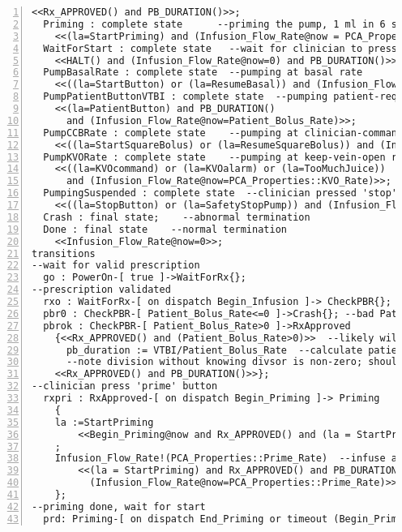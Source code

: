\begin{lstlisting}[language=aadl, gobble=0, numbers=left, caption={\lstinline{Rate_Controller} thread}, label={listing:aadl:rate_controller_thread}]
    <<Rx_APPROVED() and PB_DURATION()>>;
  Priming : complete state      --priming the pump, 1 ml in 6 sec
    <<(la=StartPriming) and (Infusion_Flow_Rate@now = PCA_Properties::Prime_Rate) and PB_DURATION()>>;
  WaitForStart : complete state   --wait for clinician to press 'start' button
    <<HALT() and (Infusion_Flow_Rate@now=0) and PB_DURATION()>>;
  PumpBasalRate : complete state  --pumping at basal rate
    <<((la=StartButton) or (la=ResumeBasal)) and (Infusion_Flow_Rate@now=Basal_Rate@now) and PB_DURATION()>>;
  PumpPatientButtonVTBI : complete state  --pumping patient-requested bolus
    <<(la=PatientButton) and PB_DURATION()
      and (Infusion_Flow_Rate@now=Patient_Bolus_Rate)>>;
  PumpCCBRate : complete state    --pumping at clinician-commanded bolus rate
    <<((la=StartSquareBolus) or (la=ResumeSquareBolus)) and (Infusion_Flow_Rate@now=Square_Bolus_Rate@now) and PB_DURATION()>>;
  PumpKVORate : complete state    --pumping at keep-vein-open rate
    <<((la=KVOcommand) or (la=KVOalarm) or (la=TooMuchJuice))  and PB_DURATION()
      and (Infusion_Flow_Rate@now=PCA_Properties::KVO_Rate)>>;
  PumpingSuspended : complete state  --clinician pressed 'stop' button
    <<((la=StopButton) or (la=SafetyStopPump)) and (Infusion_Flow_Rate@now=0)>>;
  Crash : final state;    --abnormal termination
  Done : final state    --normal termination
    <<Infusion_Flow_Rate@now=0>>;
transitions
--wait for valid prescription
  go : PowerOn-[ true ]->WaitForRx{};  
--prescription validated
  rxo : WaitForRx-[ on dispatch Begin_Infusion ]-> CheckPBR{};
  pbr0 : CheckPBR-[ Patient_Bolus_Rate<=0 ]->Crash{}; --bad Patient_Bolus_Rate
  pbrok : CheckPBR-[ Patient_Bolus_Rate>0 ]->RxApproved
    {<<Rx_APPROVED() and (Patient_Bolus_Rate>0)>>  --likely will change from logic variable to predicate Rx_APPROVED()
      pb_duration := VTBI/Patient_Bolus_Rate  --calculate patient bolus duration
      --note division without knowing divsor is non-zero; should generate additional proof obligations for assignment using division
    <<Rx_APPROVED() and PB_DURATION()>>};  
--clinician press 'prime' button
  rxpri : RxApproved-[ on dispatch Begin_Priming ]-> Priming  
    {
    la :=StartPriming
        <<Begin_Priming@now and Rx_APPROVED() and (la = StartPriming) and PB_DURATION()>>
    ; 
    Infusion_Flow_Rate!(PCA_Properties::Prime_Rate)  --infuse at prime rate
        <<(la = StartPriming) and Rx_APPROVED() and PB_DURATION() and
          (Infusion_Flow_Rate@now=PCA_Properties::Prime_Rate)>>   
    };
--priming done, wait for start
  prd: Priming-[ on dispatch End_Priming or timeout (Begin_Priming) PCA_Properties::Prime_Time sec]-> WaitForStart  

\end{lstlisting}
